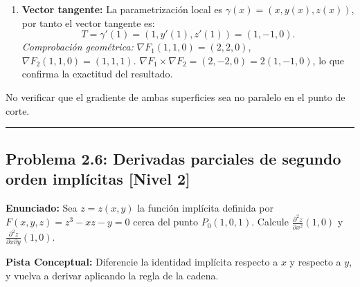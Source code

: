 \documentclass[11pt,a4paper]{article}
\begin{document}
\begin{enumerate}[label=\textbf{\arabic*.}]
\item \textbf{Vector tangente:}
La parametrización local es $\gamma(x) = (x, y(x), z(x))$, por tanto el vector tangente es:
\begin{equation*}
T = \gamma'(1) = (1, y'(1), z'(1)) = (1, -1, 0).
\end{equation*}
\textit{Comprobación geométrica:}
$\nabla F_1(1,1,0) = (2, 2, 0)$, $\nabla F_2(1,1,0) = (1, 1, 1)$.
$\nabla F_1 \times \nabla F_2 = (2, -2, 0) = 2(1, -1, 0)$, lo que confirma la exactitud del resultado.
\end{enumerate}

\begin{trapbox}
No verificar que el gradiente de ambas superficies sea no paralelo en el punto de corte.
\end{trapbox}

\vspace{0.5cm}
\hrule
\vspace{0.5cm}

\subsection*{Problema 2.6: Derivadas parciales de segundo orden implícitas \hfill \color{primaryblue}\small[Nivel 2]}

\begin{tcolorbox}[colback=white,colframe=gray!40,arc=1mm,boxrule=0.5pt,left=3mm,right=3mm,top=2mm,bottom=2mm]
\textbf{Enunciado:} Sea $z = z(x,y)$ la función implícita definida por $F(x,y,z) = z^3 - xz - y = 0$ cerca del punto $P_0(1, 0, 1)$. Calcule $\frac{\partial^2 z}{\partial x^2}(1,0)$ y $\frac{\partial^2 z}{\partial x \partial y}(1,0)$.
\end{tcolorbox}

\begin{tcolorbox}[colback=yellow!4,colframe=accentamber!70,arc=1mm,boxrule=0.5pt,left=3mm,right=3mm,top=1.5mm,bottom=1.5mm]
\textbf{Pista Conceptual:} Diferencie la identidad implícita respecto a $x$ y respecto a $y$, y vuelva a derivar aplicando la regla de la cadena.
\end{tcolorbox}
\end{document}

